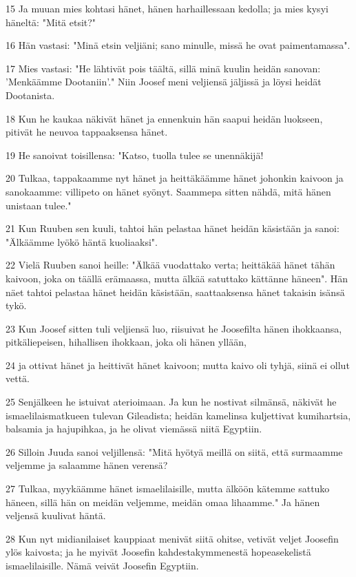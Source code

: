 \par 15 Ja muuan mies kohtasi hänet, hänen harhaillessaan kedolla; ja mies kysyi häneltä: "Mitä etsit?"
\par 16 Hän vastasi: "Minä etsin veljiäni; sano minulle, missä he ovat paimentamassa".
\par 17 Mies vastasi: "He lähtivät pois täältä, sillä minä kuulin heidän sanovan: 'Menkäämme Dootaniin'." Niin Joosef meni veljiensä jäljissä ja löysi heidät Dootanista.
\par 18 Kun he kaukaa näkivät hänet ja ennenkuin hän saapui heidän luokseen, pitivät he neuvoa tappaaksensa hänet.
\par 19 He sanoivat toisillensa: "Katso, tuolla tulee se unennäkijä!
\par 20 Tulkaa, tappakaamme nyt hänet ja heittäkäämme hänet johonkin kaivoon ja sanokaamme: villipeto on hänet syönyt. Saammepa sitten nähdä, mitä hänen unistaan tulee."
\par 21 Kun Ruuben sen kuuli, tahtoi hän pelastaa hänet heidän käsistään ja sanoi: "Älkäämme lyökö häntä kuoliaaksi".
\par 22 Vielä Ruuben sanoi heille: "Älkää vuodattako verta; heittäkää hänet tähän kaivoon, joka on täällä erämaassa, mutta älkää satuttako kättänne häneen". Hän näet tahtoi pelastaa hänet heidän käsistään, saattaaksensa hänet takaisin isänsä tykö.
\par 23 Kun Joosef sitten tuli veljiensä luo, riisuivat he Joosefilta hänen ihokkaansa, pitkäliepeisen, hihallisen ihokkaan, joka oli hänen yllään,
\par 24 ja ottivat hänet ja heittivät hänet kaivoon; mutta kaivo oli tyhjä, siinä ei ollut vettä.
\par 25 Senjälkeen he istuivat aterioimaan. Ja kun he nostivat silmänsä, näkivät he ismaelilaismatkueen tulevan Gileadista; heidän kamelinsa kuljettivat kumihartsia, balsamia ja hajupihkaa, ja he olivat viemässä niitä Egyptiin.
\par 26 Silloin Juuda sanoi veljillensä: "Mitä hyötyä meillä on siitä, että surmaamme veljemme ja salaamme hänen verensä?
\par 27 Tulkaa, myykäämme hänet ismaelilaisille, mutta älköön kätemme sattuko häneen, sillä hän on meidän veljemme, meidän omaa lihaamme." Ja hänen veljensä kuulivat häntä.
\par 28 Kun nyt midianilaiset kauppiaat menivät siitä ohitse, vetivät veljet Joosefin ylös kaivosta; ja he myivät Joosefin kahdestakymmenestä hopeasekelistä ismaelilaisille. Nämä veivät Joosefin Egyptiin.

